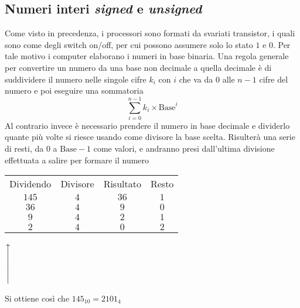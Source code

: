 \documentclass[a4paper,12pt]{article}
\theoremstyle{break}
\newcommand{\xuparrow}[1]{%
  {\left\uparrow\vbox to #1{}\right.\kern-\nulldelimiterspace}
}
\numberwithin{equation}{section}
\begin{document}
\subsection{Numeri interi \textit{signed} e \textit{unsigned}}
Come visto in precedenza, i processori sono formati da svariati transistor, i quali sono come degli switch on/off, per cui possono assumere solo lo stato \(1\) e \(0\). Per tale motivo i computer elaborano i numeri in base binaria.
Una regola generale per convertire un numero da una base non decimale a quella decimale è di suddividere il numero nelle singole cifre \(k_i\) con \(i\) che va da \(0\) alle \(n-1\) cifre del numero e poi eseguire una sommatoria
\[
    \sum_{i=0}^{n-1} k_i \times \mbox{Base}^i
\]
Al contrario invece è necessario prendere il numero in base decimale e dividerlo quante più volte si riesce usando come divisore la base scelta. Risulterà una serie di resti, da \(0\) a \(\mbox{Base}-1\) come valori, e andranno presi dall'ultima divisione effettuata a salire per formare il numero
\begin{center}
    \begin{tabular}{|c|c|c|c|}
    \hline
    Dividendo & Divisore& Risultato & Resto \\
    \(145\) & \(4\) & \(36\) & \(1\) \\
    \(36\) & \(4\) & \(9\) & \(0\) \\
    \(9\) & \(4\) & \(2\) & \(1\) \\
    \(2\) & \(4\) & \(0\) & \(2\) \\
    \hline
    \end{tabular}
   \( \xuparrow{1cm}\)
\end{center}
Si ottiene così che \(145_{10} = 2101_{4}\)
\end{document}
